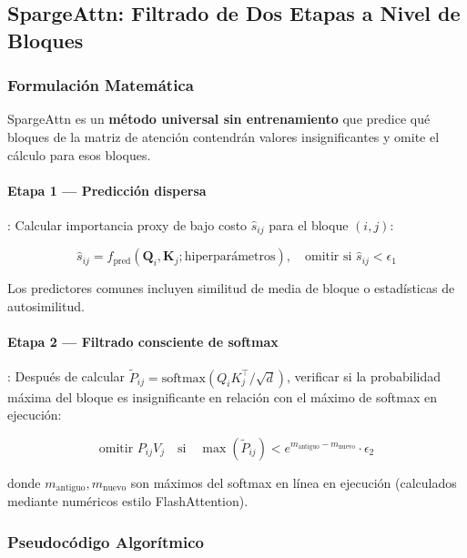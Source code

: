 \subsection{SpargeAttn: Filtrado de Dos Etapas a Nivel de Bloques}

\subsubsection{Formulación Matemática}

SpargeAttn \citep{zhang_spargeattn_2025} es un \textbf{método universal sin entrenamiento} que predice qué bloques de la matriz de atención contendrán valores insignificantes y omite el cálculo para esos bloques.

\paragraph{Etapa 1 --- Predicción dispersa}: Calcular importancia proxy de bajo costo $\hat{s}_{ij}$ para el bloque $(i,j)$:

\[
\hat{s}_{ij} = f_{\text{pred}}(\mathbf{Q}_i, \mathbf{K}_j; \text{hiperparámetros}), \quad \text{omitir si } \hat{s}_{ij} < \epsilon_1
\]

Los predictores comunes incluyen similitud de media de bloque o estadísticas de autosimilitud.

\paragraph{Etapa 2 --- Filtrado consciente de softmax}: Después de calcular $\tilde{P}_{ij} = \text{softmax}(Q_i K_j^\top/\sqrt{d})$, verificar si la probabilidad máxima del bloque es insignificante en relación con el máximo de softmax en ejecución:

\[
\text{omitir } P_{ij} V_j \quad \text{si} \quad \max(\tilde{P}_{ij}) < e^{m_{\text{antiguo}} - m_{\text{nuevo}}} \cdot \epsilon_2
\]

donde $m_{\text{antiguo}}, m_{\text{nuevo}}$ son máximos del softmax en línea en ejecución (calculados mediante numéricos estilo FlashAttention).

\subsubsection{Pseudocódigo Algorítmico}


